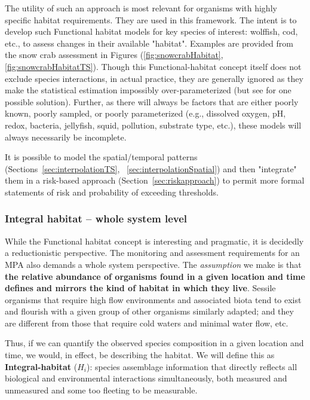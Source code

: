 \documentclass[letterpaper,portrait,11pt]{scrartcl}
\numberwithin{equation}{section}    %
\numberwithin{figure}{section}    %
\numberwithin{table}{section}       %
\begin{document}
The utility of such an approach is most relevant for organisms with highly specific habitat requirements. They are used in this framework. The intent is to develop such Functional habitat models for key species of interest: wolffish, cod, etc., to assess changes in their available "habitat". Examples are provided from the snow crab assessment in Figures (\ref{fig:snowcrabHabitat}, \ref{fig:snowcrabHabitatTS}). Though this Functional-habitat concept itself does not exclude species interactions, in actual practice, they are generally ignored as they make the statistical estimation impossibly over-parameterized (but see \cite{choi:2012:resdoc} for one possible solution). Further, as there will always be factors that are either poorly known, poorly sampled, or poorly parameterized (e.g., dissolved oxygen, pH, redox, bacteria, jellyfish, squid, pollution, substrate type, etc.), these models will always necessarily be incomplete. 

It is possible to model the spatial/temporal patterns (Sections~\ref{sec:interpolationTS}, ~\ref{sec:interpolationSpatial}) and then "integrate" them in a risk-based approach (Section~\ref{sec:riskapproach}) to permit more formal statements of risk and probability of exceeding thresholds. 



\subsubsection{Integral habitat -- whole system level}
\label{sec:integralHabitat}

While the Functional habitat concept is interesting and pragmatic, it is decidedly a reductionistic perspective. The monitoring and assessment requirements for an MPA also demands a whole system perspective. The \textit{assumption} we make is that \textbf{the relative abundance of organisms found in a given location and time defines and mirrors the kind of habitat in which they live}. Sessile organisms that require high flow environments and associated biota tend to exist and flourish with a given group of other organisms similarly adapted; and they are different from those that require cold waters and minimal water flow, etc. 

Thus, if we can quantify the observed species composition in a given location and time, we would, in effect, be describing the habitat. We will define this as \textbf{Integral-habitat} ($H_i$): species assemblage information that directly reflects all biological and environmental interactions simultaneously, both measured and unmeasured and some too fleeting to be measurable. 
\end{document}
